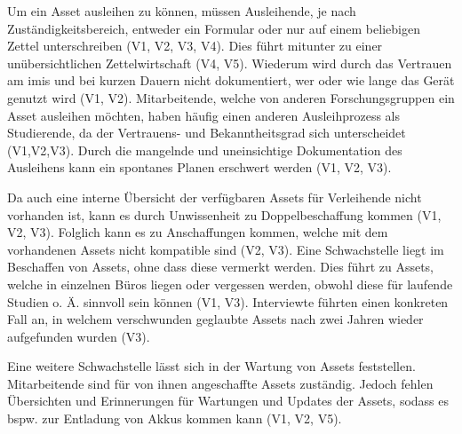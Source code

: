 Um ein Asset ausleihen zu können, müssen Ausleihende, je nach Zuständigkeitsbereich, entweder ein
Formular oder nur auf einem beliebigen Zettel unterschreiben (V1, V2, V3, V4). Dies führt mitunter
zu einer unübersichtlichen Zettelwirtschaft (V4, V5). Wiederum wird durch das Vertrauen am \ac{imis}
und bei kurzen Dauern nicht dokumentiert, wer oder wie lange das Gerät genutzt wird (V1, V2).
Mitarbeitende, welche von anderen Forschungsgruppen ein Asset ausleihen möchten, haben häufig einen
anderen Ausleihprozess als Studierende, da der Vertrauens- und Bekanntheitsgrad sich unterscheidet
(V1,V2,V3). Durch die mangelnde und uneinsichtige Dokumentation des Ausleihens kann ein spontanes
Planen erschwert werden (V1, V2, V3).

Da auch eine interne Übersicht der verfügbaren Assets für Verleihende nicht vorhanden ist, kann es
durch Unwissenheit zu Doppelbeschaffung kommen (V1, V2, V3). Folglich kann es zu Anschaffungen
kommen, welche mit dem vorhandenen Assets nicht kompatible sind (V2, V3). Eine Schwachstelle liegt
im Beschaffen von Assets, ohne dass diese vermerkt werden. Dies führt zu Assets, welche in einzelnen
Büros liegen oder vergessen werden, obwohl diese für laufende Studien o. Ä. sinnvoll sein können
(V1, V3). Interviewte führten einen konkreten Fall an, in welchem verschwunden geglaubte Assets nach
zwei Jahren wieder aufgefunden wurden (V3).

Eine weitere Schwachstelle lässt sich in der Wartung von Assets feststellen. Mitarbeitende sind für
von ihnen angeschaffte Assets zuständig. Jedoch fehlen Übersichten und Erinnerungen für Wartungen
und Updates der Assets, sodass es bspw. zur Entladung von Akkus kommen kann (V1, V2, V5).

